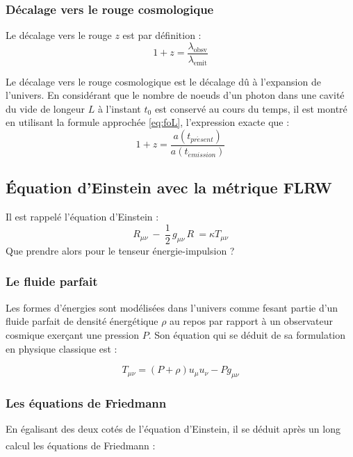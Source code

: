 \documentclass[10pt, a4paper]{report}
\numberwithin{equation}{subsection}
\begin{document}
\subsubsection{Décalage vers le rouge cosmologique}
Le décalage vers le rouge $z$ est par définition : 
\begin{equation}
\boxed{1+z = \frac{\lambda_{\mathrm{obsv}}}{\lambda_{\mathrm{emit}}}}
\end{equation}

Le décalage vers le rouge cosmologique est le décalage dû à l'expansion de l'univers. En considérant que le nombre de noeuds d'un photon dans une cavité du vide de longeur $L$ à l'instant $t_0$ est conservé au cours du temps, il est montré en utilisant la formule approchée \ref{eq:foL}, l'expression exacte que :
\begin{equation} \label{eq:zC}
\boxed{1+z = \frac{a(t_{pr\acute esent})}{a(t_{\acute emission})}}
\end{equation}

\subsection{\uppercase{é}quation d'Einstein avec la métrique FLRW}
Il est rappelé l'équation d'Einstein :
\begin{equation} \label{eq:EFE}
\boxed{R_{\mu \nu} \ - \ \frac{1}{2} \, g_{\mu \nu} \, R  \  =  \kappa T_{\mu \nu}}
\end{equation}
Que prendre alors pour le tenseur énergie-impulsion ?
\subsubsection{Le fluide parfait}
Les formes d'énergies sont modélisées dans l'univers comme fesant partie d'un fluide parfait de densité énergétique $\rho$ au repos par rapport à un observateur cosmique exerçant une pression $P$. Son équation qui se déduit de sa formulation en physique classique est : 

\begin{equation} \label{eq:FP}
\boxed{T_{\mu\nu} = (P + \rho) u_\mu u_\nu - P g_{\mu\nu}}
\end{equation}

\subsubsection{Les équations de Friedmann}
En égalisant des deux cotés de l'équation d'Einstein, il se déduit après un long calcul\textsuperscript{\cite{cours_RG1}} les équations de Friedmann :
\end{document}
